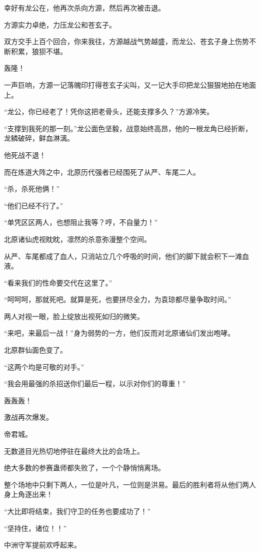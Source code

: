\begin{this_body}
幸好有龙公在，他再次杀向方源，然后再次被击退。

方源实力卓绝，力压龙公和苍玄子。

双方交手上百个回合，你来我往，方源越战气势越盛，而龙公、苍玄子身上伤势不断积累，狼狈不堪。

轰隆！

一声巨响，方源一记落魄印打得苍玄子尖叫，又一记大手印把龙公狠狠地拍在地面上。

“龙公，你已经老了！凭你这把老骨头，还能支撑多久？”方源冷笑。

“支撑到我死的那一刻。”龙公面色坚毅，战意始终高昂，他的一根龙角已经折断，龙鳞破碎，鲜血淋漓。

他死战不退！

而在炼道大阵之中，北原历代强者已经围死了从严、车尾二人。

“杀，杀死他俩！”

“他们已经不行了。”

“单凭区区两人，也想阻止我等？哼，不自量力！”

北原诸仙虎视眈眈，凛然的杀意弥漫整个空间。

从严、车尾都成了血人，只消站立几个呼吸的时间，他们的脚下就会积下一滩血液。

“看来我们的性命要交代在这里了。”

“呵呵呵，那就死吧。就算是死，也要拼尽全力，为袁琼都尽量争取时间。”

两人对视一眼，脸上绽放出视死如归的微笑。

“来吧，来最后一战！”身为弱势的一方，他们反而对北原诸仙们发出咆哮。

北原群仙面色变了。

“这两个均是可敬的对手。”

“我会用最强的杀招送你们最后一程，以示对你们的尊重！”

轰轰轰！

激战再次爆发。

帝君城。

无数道目光热切地停驻在最终大比的会场上。

绝大多数的参赛蛊师都失败了，一个个静悄悄离场。

整个场地中只剩下两人，一位是叶凡，一位则是洪易。最后的胜利者将从他们两人身上角逐出来！

“大比即将结束，我们守卫的任务也要成功了！”

“坚持住，诸位！！”

中洲守军提前欢呼起来。


\end{this_body}
